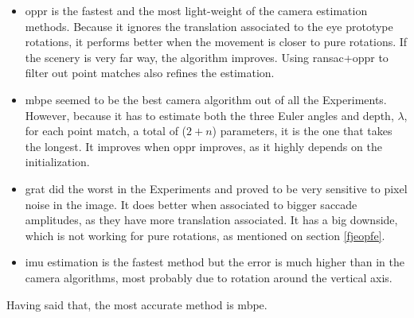 \begin{itemize}
	\item \acrshort{oppr} is the fastest and the most light-weight of the camera estimation methods. Because it ignores the translation associated to the eye prototype rotations, it performs better when the movement is closer to pure rotations. If the scenery is very far way, the algorithm improves. Using \acrshort{ransac}+\acrshort{oppr} to filter out point matches also refines the estimation.
	
	\item \acrshort{mbpe} seemed to be the best camera algorithm out of all the Experiments. However, because it has to estimate both the three Euler angles and depth, $\lambda$, for each point match, a total of ($2+n$) parameters, it is the one that takes the longest. It improves when \acrshort{oppr} improves, as it highly depends on the initialization.
	
	\item \acrshort{grat} did the worst in the Experiments and proved to be very sensitive to pixel noise in the image. It does better when associated to bigger saccade amplitudes, as they have more translation associated. It has a big downside, which is not working for pure rotations, as mentioned on section \ref{fjeopfe}.
	
	\item \acrshort{imu} estimation is the fastest method but the error is much higher than in the camera algorithms, most probably due to rotation around the vertical axis.	
	
\end{itemize}

Having said that, the most accurate method is \acrshort{mbpe}. 

















